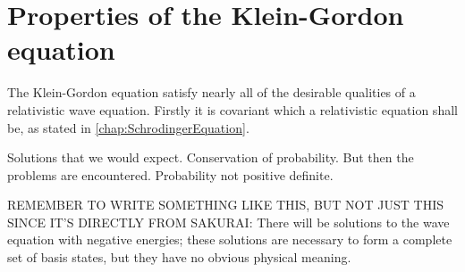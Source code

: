 \section{Properties of the Klein-Gordon equation}
The Klein-Gordon equation satisfy nearly all of the desirable qualities of a relativistic wave equation. Firstly it is covariant which a relativistic equation shall be, as stated in \cref{chap:SchrodingerEquation}.

Solutions that we would expect. Conservation of probability. But then the problems are encountered. Probability not positive definite.

REMEMBER TO WRITE SOMETHING LIKE THIS, BUT NOT JUST THIS SINCE IT'S DIRECTLY FROM SAKURAI: There will be solutions to the wave equation with negative energies; these solutions are necessary to form a complete set of basis states, but they have no obvious physical meaning.